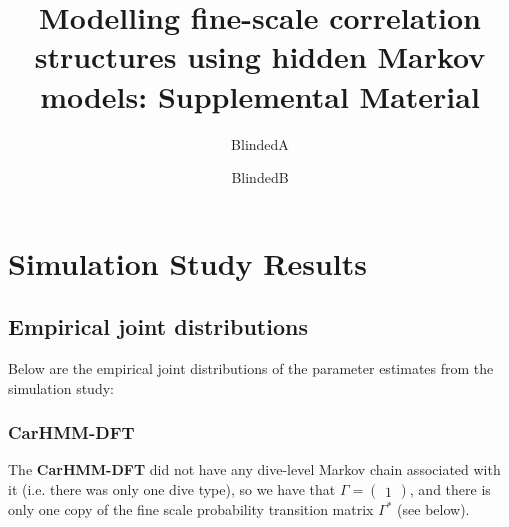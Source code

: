 \documentclass[12pt]{TD-CJS}
\begin{document}

\renewcommand{\eqref}[1]{(\ref{#1})}
\newcommand{\mb}[1]{\mathbf{#1}}
\newcommand{\mbb}[1]{\mathbb{#1}}
\newcommand{\mt}[1]{\mathrm{#1}}
\newcommand{\rv}{random variable}
\newcommand{\newblock}{}


\title[]{Modelling fine-scale correlation structures using hidden Markov models: Supplemental Material}%
\author{BlindedA\thanksref{*}}
\author{BlindedB}


\makechaptertitle

\section{Simulation Study Results}

\subsection{Empirical joint distributions}

Below are the empirical joint distributions of the parameter estimates from the simulation study:

\subsubsection{\textbf{CarHMM-DFT}}

The \textbf{CarHMM-DFT} did not have any dive-level Markov chain associated with it (i.e. there was only one dive type), so we have that $\Gamma = \begin{pmatrix} 1 \end{pmatrix}$, and there is only one copy of the fine scale probability transition matrix $\Gamma^*$ (see below).
\end{document}
